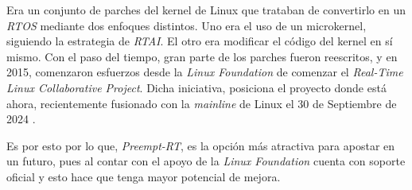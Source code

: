 
Era un conjunto de parches del kernel de Linux que trataban de convertirlo en un \textit{RTOS} mediante dos enfoques distintos. Uno era el uso de un microkernel, siguiendo la estrategia de \textit{RTAI}. El otro era modificar el código del kernel en sí mismo. Con el paso del tiempo, gran parte de los parches fueron reescritos, y en 2015, comenzaron esfuerzos desde la \textit{Linux Foundation} de comenzar el \textit{Real-Time Linux Collaborative Project}. Dicha iniciativa, posiciona el proyecto donde está ahora, recientemente fusionado con la \textit{mainline} de Linux el 30 de Septiembre de 2024 \cite{RTLdeveloperteam2022, RTLdeveloperteam2024}.

Es por esto por lo que, \textit{Preempt-RT}, es la opción más atractiva para apostar en un futuro, pues al contar con el apoyo de la \textit{Linux Foundation} cuenta con soporte oficial y esto hace que tenga mayor potencial de mejora.
